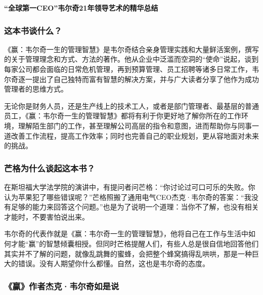 \cleardoublepage
{}


\begin{BookSummaryBox}
\textbf{“全球第一CEO”韦尔奇21年领导艺术的精华总结}
\par
\end{BookSummaryBox}

\subsubsection*{这本书谈什么？}

《赢：韦尔奇一生的管理智慧》是韦尔奇结合亲身管理实践和大量鲜活案例，撰写的关于管理理念和方式、方法的著作。他从企业中泛滥而空洞的“使命”说起，谈到每家公司都会面临的日常危机管理，再到预算管理、员工招聘等诸多日常工作，韦尔奇逐一提出了自己独特而富有智慧的解决方案，并与广大读者分享了他作为成功管理者的思维方式。
\par

无论你是财务人员，还是生产线上的技术工人，或者是部门管理者、最基层的普通员工，《赢：韦尔奇一生的管理智慧》都将有利于你更好地了解你所在的工作环境，理解陌生部门的工作，甚至理解公司高层的指令和意图，进而帮助你与同事一道改善工作流程，提高工作效率；同时也完善自己的职业规划，更从容地面对未来的挑战。
\par

\subsubsection*{芒格为什么谈起这本书？}

在斯坦福大学法学院的演讲中，有提问者问芒格：“你讨论过可口可乐的失败。你认为苹果犯了哪些错误呢？”芒格照搬了通用电气CEO杰克·韦尔奇的答案：“我没有足够的能力来回答这个问题。”也是为了说明一个道理：当你不了解，也没有相关才能时，不要害怕说出来。
\par

韦尔奇的代表作就是《赢：韦尔奇一生的管理智慧》，他将自己在工作与生活中如何才能“赢”的智慧倾囊相授。但同时芒格提醒人们，有些人总是很自信地回答他们其实并不了解的问题，就像乱跳舞的蜜蜂，会把整个蜂窝搞得乱哄哄，那是一种巨大的错误。没有人期望你什么都懂。自然，这也是韦尔奇的态度。
\par

\subsubsection*{《赢》作者杰克·韦尔奇如是说}

